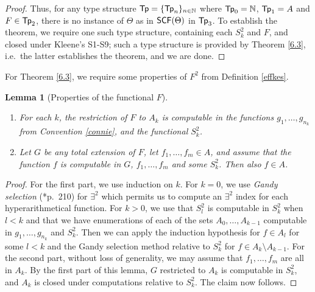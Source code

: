 \documentclass[reqno]{amsart}
\newtheorem{lemma}[thm]{Lemma}
\def\N{{\mathbb  N}}
\def\SCF{\textup{\textsf{SCF}}}
\numberwithin{equation}{section}
\numberwithin{thm}{section}
\begin{document}
\begin{proof}
\smallskip

Thus, for any type structure ${\rm \textsf{\textup{Tp}}} = \{{\rm \textsf{\textup{Tp}}}_n\}_{n \in \N}$ where ${\rm \textsf{\textup{Tp}}}_0 = \N$, ${\rm \textsf{\textup{Tp}}}_1 = A$ and $F \in {\rm \textsf{\textup{Tp}}}_2$, there is no instance of $\Theta $ as in $\SCF(\Theta)$ in ${\rm \textsf{\textup{Tp}}}_3$.  To establish the theorem, we require one such type structure, containing each $S^2_k$ and $F$, and closed under Kleene's S1-S9; such a type structure is provided by Theorem \ref{6.3}, i.e.\ the latter establishes the theorem, and we are done.    
\end{proof}
For Theorem \ref{6.3}, we require some properties of $F^{2}$ from Definition \ref{effkes}.
\begin{lemma}[Properties of the functional $F$]\label{6.1} ~
\begin{enumerate}
\item  For each $k$, the restriction of $F$ to $A_k$ is computable in the functions $g_1 , \ldots , g_{n_k}$ from Convention \ref{connie}, and the functional $S^2_k$.  %
\item Let $G$ be any total extension of $F$, let $f_1 , \ldots , f_m \in A$, and assume that the function $f$ is computable in $G$, $f_1 , \ldots, f_m$ and some $S^2_k$. Then also $f \in A$. %
\end{enumerate}
\end{lemma}
\begin{proof}
For the first part, we use induction on $k$. For $k = 0$, we use \emph{Gandy selection} (\cite{longmann}*{p.\ 210}) for $\exists^2$ which permits us to compute an $\exists^2$ index for each hyperarithmetical function. 
For $k > 0$, we use that $S^2_l$ is computable in $S^2_k$ when $l < k$ 
and that we have enumerations of each of the sets $A_0, \ldots, A_{k-1}$ computable in $g_1 , \ldots , g_{n_k}$ and $S^2_k$. %
Then we can apply the induction hypothesis for $f \in A_l$ for some $l < k$ and the Gandy selection method relative to $S^2_k$ for $f \in A_k \setminus A_{k-1}$.
For the second part, without loss of generality, we may assume that $f_1 , \ldots , f_m$ are all in $A_k$. By the first part of this lemma, $G$ restricted to $A_k$ is computable in $S^2_k$, and $A_k$ is closed under computations relative to $S^2_k$. The claim now follows.
%
\end{proof}
\end{document}
